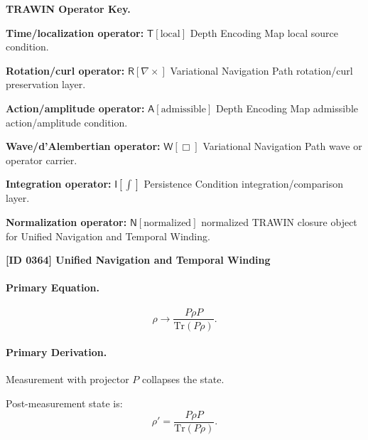 \par\vspace{0.45\baselineskip}
\noindent\begin{minipage}[t]{\linewidth}
\begingroup
\small
\raggedright
\textbf{TRAWIN Operator Key.}\par
\noindent\textbf{Time/localization operator:} $\mathsf{T}\!\left[\mathrm{local}\right]$ Depth Encoding Map local source condition.\par
\noindent\textbf{Rotation/curl operator:} $\mathsf{R}\!\left[\nabla\times\right]$ Variational Navigation Path rotation/curl preservation layer.\par
\noindent\textbf{Action/amplitude operator:} $\mathsf{A}\!\left[\mathrm{admissible}\right]$ Depth Encoding Map admissible action/amplitude condition.\par
\noindent\textbf{Wave/d'Alembertian operator:} $\mathsf{W}\!\left[\Box\right]$ Variational Navigation Path wave or operator carrier.\par
\noindent\textbf{Integration operator:} $\mathsf{I}\!\left[\int\right]$ Persistence Condition integration/comparison layer.\par
\noindent\textbf{Normalization operator:} $\mathsf{N}\!\left[\mathrm{normalized}\right]$ normalized TRAWIN closure object for Unified Navigation and Temporal Winding.\par
\endgroup
\end{minipage}

\clearpage
\noindent\textbf{[ID 0364] Unified Navigation and Temporal Winding}\par
\vspace{0.35em}
\paragraph{Primary Equation.}
\begin{equation}
\rho \rightarrow \frac{P \rho P}{\mathrm{Tr}(P\rho)}.
\end{equation}

\paragraph{Primary Derivation.}
Measurement with projector $P$ collapses the state.

Post-measurement state is:
\begin{equation}
\rho' = \frac{P \rho P}{\mathrm{Tr}(P\rho)}.
\end{equation}


